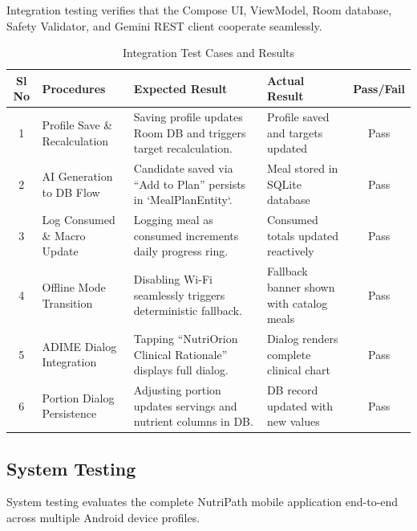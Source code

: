 \documentclass[a4paper,12pt]{report}
\begin{document}
Integration testing verifies that the Compose UI, ViewModel, Room database, Safety Validator, and Gemini REST client cooperate seamlessly.

\begin{table}[H]
\centering
\begin{tabular}{|c|p{3.2cm}|p{4.4cm}|p{4.4cm}|c|}
\hline
\textbf{Sl No} & \textbf{Procedures} & \textbf{Expected Result} & \textbf{Actual Result} & \textbf{Pass/Fail} \\
\hline \hline
1 & Profile Save \& Recalculation & Saving profile updates Room DB and triggers target recalculation. & Profile saved and targets updated & Pass \\
\hline
2 & AI Generation to DB Flow & Candidate saved via ``Add to Plan'' persists in `MealPlanEntity`. & Meal stored in SQLite database & Pass \\
\hline
3 & Log Consumed \& Macro Update & Logging meal as consumed increments daily progress ring. & Consumed totals updated reactively & Pass \\
\hline
4 & Offline Mode Transition & Disabling Wi-Fi seamlessly triggers deterministic fallback. & Fallback banner shown with catalog meals & Pass \\
\hline
5 & ADIME Dialog Integration & Tapping ``NutriOrion Clinical Rationale'' displays full dialog. & Dialog renders complete clinical chart & Pass \\
\hline
6 & Portion Dialog Persistence & Adjusting portion updates servings and nutrient columns in DB. & DB record updated with new values & Pass \\
\hline
\end{tabular}
\caption{Integration Test Cases and Results}
\end{table}

\subsection{System Testing}

System testing evaluates the complete NutriPath mobile application end-to-end across multiple Android device profiles.
\end{document}
